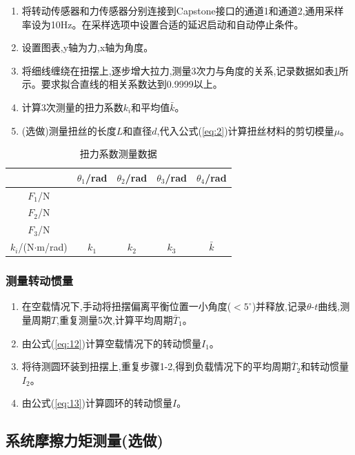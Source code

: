 \documentclass[UTF8]{ctexart}
\begin{document}
    \begin{enumerate}
    \item 将转动传感器和力传感器分别连接到Capstone接口的通道1和通道2,通用采样率设为10Hz。在采样选项中设置合适的延迟启动和自动停止条件。
    \item 设置图表,y轴为力,x轴为角度。
    \item 将细线缠绕在扭摆上,逐步增大拉力,测量3次力与角度的关系,记录数据如表\ref{tab:3}所示。要求拟合直线的相关系数达到0.9999以上。
    \item 计算3次测量的扭力系数$k_i$和平均值$\bar{k}$。
    \item (选做)测量扭丝的长度$L$和直径$d$,代入公式(\ref{eq:2})计算扭丝材料的剪切模量$\mu$。
    \end{enumerate}
    
    \begin{table}[htbp]
    \centering
    \caption{扭力系数测量数据} \label{tab:3}
    \begin{tabular}{ccccc}
    \hline
     & $\theta_1$/rad & $\theta_2$/rad & $\theta_3$/rad & $\theta_4$/rad\\
    \hline  
    $F_1$/N &  &  &  & \\ 
    $F_2$/N &  &  &  & \\
    $F_3$/N &  &  &  & \\
    \hline
    $k_i$/(N$\cdot$m/rad) & $k_1$ & $k_2$ & $k_3$ & $\bar{k}$\\  
    \hline
    \end{tabular}
    \end{table}
    
    \subsubsection{测量转动惯量}
    
    \begin{enumerate}
    \item 在空载情况下,手动将扭摆偏离平衡位置一小角度($<5^\circ$)并释放,记录$\theta$-$t$曲线,测量周期$T$,重复测量5次,计算平均周期$\bar{T}_1$。
    \item 由公式(\ref{eq:12})计算空载情况下的转动惯量$I_1$。
    \item 将待测圆环装到扭摆上,重复步骤1-2,得到负载情况下的平均周期$\bar{T}_2$和转动惯量$I_2$。
    \item 由公式(\ref{eq:13})计算圆环的转动惯量$I$。
    \end{enumerate}
    
    \subsection{系统摩擦力矩测量(选做)}
    
\end{document}
